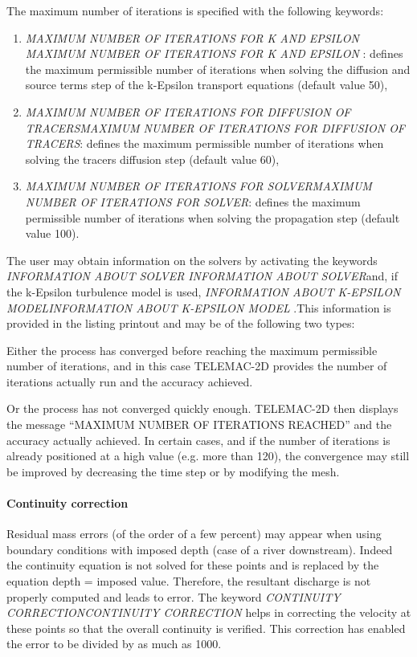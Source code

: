 \documentclass{article} %
\begin{document}
 The maximum number of iterations is specified with the following keywords:

\begin{enumerate}
\item  \textit{MAXIMUM NUMBER OF ITERATIONS FOR K AND EPSILON} \textit{MAXIMUM NUMBER OF ITERATIONS FOR K AND EPSILON} : defines the maximum permissible number of iterations when solving the diffusion and source terms step of the k-Epsilon transport equations (default value 50),

\item  \textit{MAXIMUM NUMBER OF ITERATIONS FOR DIFFUSION OF TRACERSMAXIMUM NUMBER OF ITERATIONS FOR DIFFUSION OF TRACERS}: defines the maximum permissible number of iterations when solving the tracers diffusion step (default value 60),

\item  \textit{MAXIMUM NUMBER OF ITERATIONS FOR SOLVERMAXIMUM NUMBER OF ITERATIONS FOR SOLVER}: defines the maximum permissible number of iterations when solving the propagation step (default value 100).
\end{enumerate}

 The user may obtain information on the solvers by activating the keywords \textit{INFORMATION ABOUT SOLVER} \textit{INFORMATION ABOUT SOLVER}and, if the k-Epsilon turbulence model is used, \textit{INFORMATION ABOUT K-EPSILON MODELINFORMATION ABOUT K-EPSILON MODEL} .This information is provided in the listing printout and may be of the following two types:

 Either the process has converged before reaching the maximum permissible number of iterations, and in this case TELEMAC-2D provides the number of iterations actually run and the accuracy achieved.

 Or the process has not converged quickly enough. TELEMAC-2D then displays the message ``MAXIMUM NUMBER OF ITERATIONS REACHED'' and the accuracy actually achieved. In certain cases, and if the number of iterations is already positioned at a high value (e.g. more than 120), the convergence may still be improved by decreasing the time step or by modifying the mesh.


\paragraph{ Continuity correction}

 Residual mass errors (of the order of a few percent) may appear when using boundary conditions with imposed depth (case of a river downstream). Indeed the continuity equation is not solved for these points and is replaced by the equation depth = imposed value. Therefore, the resultant discharge is not properly computed and leads to error. The keyword \textit{CONTINUITY CORRECTIONCONTINUITY CORRECTION} helps in correcting the velocity at these points so that the overall continuity is verified. This correction has enabled the error to be divided by as much as 1000.
\end{document}

